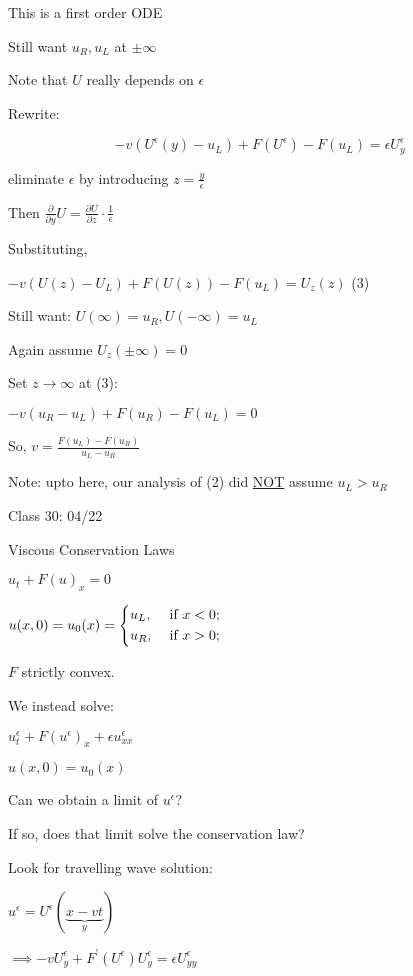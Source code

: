 \documentclass{article}
\theoremstyle{definition}
\begin{document}
This is a first order ODE

Still want \(u_R, u_L\) at \(\pm \infty\) 

Note that \(U\) really depends on \(\epsilon\) 

Rewrite:

\[
    - v (U^{\epsilon}(y) - u_L) + F(U^{\epsilon}) - F(u_L) = \epsilon U^{\epsilon}_y 
\]

eliminate \(\epsilon\) by introducing \(z = \frac{y}{\epsilon}\)  

Then \(\frac{\partial}{\partial y} U = \frac{\partial U}{\partial z} \cdot \frac{1}{\epsilon}\) 

Substituting,

\(-v (U(z)-U_L) + F(U(z)) - F(u_L)=U_z (z)\) (3)

Still want: \(U(\infty)=u_R, U(-\infty)=u_L\) 

Again assume \(U_z(\pm \infty)=0\) 

Set \(z\to \infty\) at (3):

\(-v (u_R - u_L) + F(u_R) - F(u_L) = 0\) 

So, \(v = \frac{F(u_L)-F(u_R)}{u_L - u_R}\) 

Note: upto here, our analysis of (2) did \underline{NOT} assume \(u_L > u_R\) 

\hrulefill

Class 30: 04/22

Viscous Conservation Laws

\(u_t + F(u)_x = 0\) 

\(u(x,0)=u_0(x)=\begin{dcases}
    u_L, &\text{ if } x<0 ;\\
    u_R, &\text{ if } x>0 ;
\end{dcases}\) 

\(F\) strictly convex.

We instead solve:

\(u^{\epsilon} _t + F(u^{\epsilon} )_x + \epsilon u^{\epsilon} _{x x}\)

\(u (x,0)=u_0(x)\) 

Can we obtain a limit of \(u^{\epsilon}\)?

If so, does that limit solve the conservation law?

Look for travelling wave solution:

\(u^{\epsilon} = U^{\epsilon}(\underbrace{x-vt}_y)\)

\(\implies - v U_y^{\epsilon} + F^{\prime} (U^{\epsilon})U_y^{\epsilon} = \epsilon U_{y y}^{\epsilon}   \) 
\end{document}
